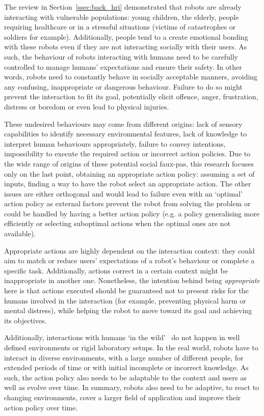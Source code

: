    The review in Section~\ref{ssec:back_hri} demonstrated that robots are already interacting with vulnerable populations: young children, the elderly, people requiring healthcare or in a stressful situations (victims of catastrophes or soldiers for example). Additionally, people tend to a create emotional bonding with these robots even if they are not interacting socially with their users. As such, the behaviour of robots interacting with humans need to be carefully controlled to manage humans' expectations and ensure their safety. In other words, robots need to constantly behave in socially acceptable manners, avoiding any confusing, inappropriate or dangerous behaviour. Failure to do so might prevent the interaction to fit its goal, potentially elicit offence, anger, frustration, distress or boredom or even lead to physical injuries. 
    
    These undesired behaviours may come from different origins: lack of sensory capabilities to identify necessary environmental features, lack of knowledge to interpret human behaviours appropriately, failure to convey intentions, impossibility to execute the required action or incorrect action policies. Due to the wide range of origins of these potential social faux-pas, this research focuses only on the last point, obtaining an appropriate action policy: assuming a set of inputs, finding a way to have the robot select an appropriate action. The other issues are either orthogonal and would lead to failure even with an `optimal' action policy as external factors prevent the robot from solving the problem or could be handled by having a better action policy (e.g. a policy generalising more efficiently or selecting suboptimal actions when the optimal ones are not available).%
    
    Appropriate actions are highly dependent on the interaction context: they could aim to match or reduce users' expectations of a robot's behaviour or complete a specific task. Additionally, actions correct in a certain context might be inappropriate in another one. Nonetheless, the intention behind being \textit{appropriate} here is that actions executed should be guaranteed not to present risks for the humans involved in the interaction (for example, preventing physical harm or mental distress), while helping the robot to move toward its goal and achieving its objectives.

    Additionally, interactions with humans `in the wild'~\citep{belpaeme2012multimodal} do not happen in well defined environments or rigid laboratory setups. In the real world, robots have to interact in diverse environments, with a large number of different people, for extended periods of time or with initial incomplete or incorrect knowledge. As such, the action policy also needs to be adaptable to the context and users as well as evolve over time. In summary, robots also need to be adaptive, to react to changing environments, cover a larger field of application and improve their action policy over time.

